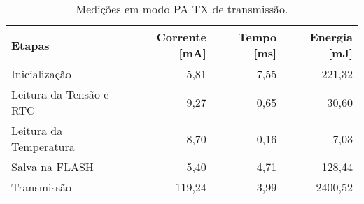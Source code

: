 \begin{table}
\centering
\caption{Medições em modo PA TX de transmissão.}
\label{tab:PA_TX}
\begin{tabular}{lrrr}
\toprule
                 Etapas &  Corrente [mA] &  Tempo [ms] &  Energia [mJ] \\
\midrule
          Inicialização &           5,81 &        7,55 &        221,32 \\
Leitura da Tensão e RTC &           9,27 &        0,65 &         30,60 \\
 Leitura da Temperatura &           8,70 &        0,16 &          7,03 \\
         Salva na FLASH &           5,40 &        4,71 &        128,44 \\
            Transmissão &         119,24 &        3,99 &       2400,52 \\
\bottomrule
\end{tabular}
\end{table}
